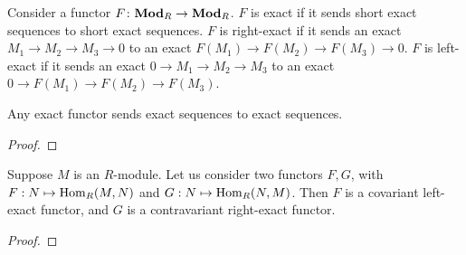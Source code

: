 \begin{definition}
    Consider a functor \(F\colon\textbf{Mod}_R\to\textbf{Mod}_R\).
    \(F\) is exact if it sends short exact sequences to short exact sequences.
    \(F\) is right-exact if it sends an exact \(M_1 \to M_2 \to M_3 \to 0\)
    to an exact \(F(M_1) \to F(M_2) \to F(M_3) \to 0\).
    \(F\) is left-exact if it sends an exact \(0 \to M_1 \to M_2 \to M_3\)
    to an exact \(0 \to F(M_1) \to F(M_2) \to F(M_3)\).
\end{definition}
\begin{proposition}
    Any exact functor sends exact sequences to exact sequences.
\end{proposition}
\begin{proof}
    
\end{proof}

\begin{theorem}
    Suppose \(M\) is an \(R\)-module.
    Let us consider two functors \(F,G\),
    with \(F: N \mapsto \operatorname{Hom}_R(M,N)\) and \(G: N \mapsto \operatorname{Hom}_R(N,M)\).
    Then \(F\) is a covariant left-exact functor,
    and \(G\) is a contravariant right-exact functor.
\end{theorem}
\begin{proof}
    
\end{proof}

